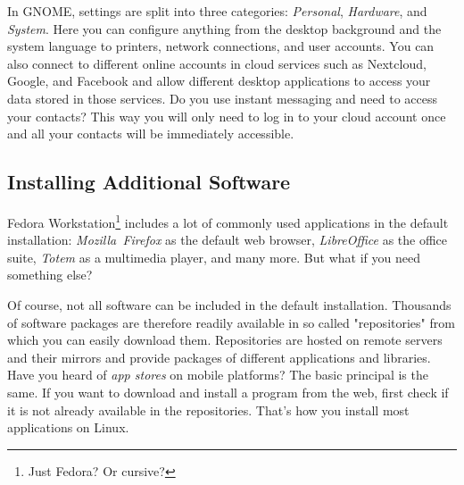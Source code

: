 \begin{enumerate}
In GNOME, settings are split into three categories: \emph{Personal}, \emph{Hardware}, and \emph{System}. Here you can configure anything from the desktop background and the system language to printers, network connections, and user accounts. You can also connect to different online accounts in cloud services such as Nextcloud, Google, and Facebook and allow different desktop applications to access your data stored in those services. Do you use instant messaging and need to access your contacts? This way you will only need to log in to your cloud account once and all your contacts will be immediately accessible.
\end{enumerate}

\subsection*{Installing Additional Software}

Fedora Workstation\footnote{Just Fedora? Or cursive?} includes a lot of commonly used applications in the default installation: \emph{Mozilla~Firefox} as the default web browser, \emph{LibreOffice} as the office suite, \emph{Totem} as a multimedia player, and many more. But what if you need something else?

Of course, not all software can be included in the default installation. Thousands of software packages are therefore readily available in so called "repositories" from which you can easily download them. Repositories are hosted on remote servers and their mirrors and provide packages of different applications and libraries. Have you heard of \emph{app stores} on mobile platforms? The basic principal is the same. If you want to download and install a program from the web, first check if it is not already available in the repositories. That's how you install most applications on Linux.

